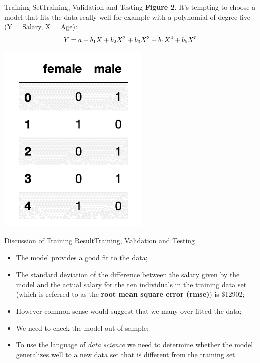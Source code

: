 \documentclass[11pt]{beamer}
\begin{document}
\begin{frame}{Training Set}{Training, Validation and Testing}
\textbf{Figure 2}. It's tempting to choose a model that fits the data really well for example with a polynomial of degree five (Y = Salary, X = Age):
	\begin{equation}
	Y = a + b_1X+b_2X^2+b_3X^3+b_4X^4+b_5X^5 \notag
	\end{equation}	 
	\begin{center}
	\includegraphics[scale=.6]{../05-pictures/lesson-2-2_pic_2.png}
	\end{center}
\end{frame}
\begin{frame}{Discussion of Training Result}{Training, Validation and Testing}
\begin{itemize}
\item The model provides a good fit to the data;
\item The standard deviation of the difference between the salary given by the model and the actual salary for the ten individuals in the training data set (which is referred to as the \textbf{root mean square error (rmse)}) is \$12902;
\item However common sense would suggest that we many over-fitted the data;
\item We need to check the model out-of-sample;
\item To use the language of \textit{data science} we need to determine \ul{whether the model generalizes well to a new data set that is different from the training set}.
\end{itemize}
\end{frame}
\end{document}
